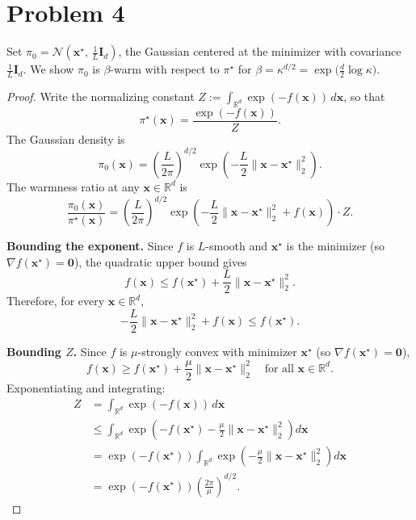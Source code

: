 \documentclass[12pt]{article}
\begin{document}
\section*{Problem 4}

Set $\pi_0 = \mathcal{N}\!\left(\mathbf{x}^\star,\, \frac{1}{L}\mathbf{I}_d\right)$, the Gaussian centered at the minimizer with covariance $\frac{1}{L}\mathbf{I}_d$. We show $\pi_0$ is $\beta$-warm with respect to $\pi^\star$ for $\beta = \kappa^{d/2} = \exp\!\bigl(\tfrac{d}{2}\log\kappa\bigr)$.

\begin{proof}
Write the normalizing constant $Z := \int_{\mathbb{R}^d} \exp(-f(\mathbf{x}))\,d\mathbf{x}$, so that
\[
\pi^\star(\mathbf{x}) = \frac{\exp(-f(\mathbf{x}))}{Z}.
\]
The Gaussian density is
\[
\pi_0(\mathbf{x}) = \left(\frac{L}{2\pi}\right)^{d/2} \exp\!\left(-\frac{L}{2}\|\mathbf{x} - \mathbf{x}^\star\|_2^2\right).
\]
The warmness ratio at any $\mathbf{x} \in \mathbb{R}^d$ is
\[
\frac{\pi_0(\mathbf{x})}{\pi^\star(\mathbf{x})} = \left(\frac{L}{2\pi}\right)^{d/2} \exp\!\left(-\frac{L}{2}\|\mathbf{x} - \mathbf{x}^\star\|_2^2 + f(\mathbf{x})\right) \cdot Z.
\]

\textbf{Bounding the exponent.} Since $f$ is $L$-smooth and $\mathbf{x}^\star$ is the minimizer (so $\nabla f(\mathbf{x}^\star) = \mathbf{0}$), the quadratic upper bound gives
\[
f(\mathbf{x}) \leq f(\mathbf{x}^\star) + \frac{L}{2}\|\mathbf{x} - \mathbf{x}^\star\|_2^2.
\]
Therefore, for every $\mathbf{x} \in \mathbb{R}^d$,
\[
-\frac{L}{2}\|\mathbf{x} - \mathbf{x}^\star\|_2^2 + f(\mathbf{x}) \leq f(\mathbf{x}^\star).
\]

\textbf{Bounding $Z$.} Since $f$ is $\mu$-strongly convex with minimizer $\mathbf{x}^\star$ (so $\nabla f(\mathbf{x}^\star) = \mathbf{0}$),
\[
f(\mathbf{x}) \geq f(\mathbf{x}^\star) + \frac{\mu}{2}\|\mathbf{x} - \mathbf{x}^\star\|_2^2 \quad \text{for all } \mathbf{x} \in \mathbb{R}^d.
\]
Exponentiating and integrating:
\begin{align*}
Z &= \int_{\mathbb{R}^d} \exp(-f(\mathbf{x}))\,d\mathbf{x} \\
  &\leq \int_{\mathbb{R}^d} \exp\!\left(-f(\mathbf{x}^\star) - \frac{\mu}{2}\|\mathbf{x} - \mathbf{x}^\star\|_2^2\right)d\mathbf{x} \\
  &= \exp(-f(\mathbf{x}^\star)) \int_{\mathbb{R}^d} \exp\!\left(-\frac{\mu}{2}\|\mathbf{x} - \mathbf{x}^\star\|_2^2\right)d\mathbf{x} \\
  &= \exp(-f(\mathbf{x}^\star)) \left(\frac{2\pi}{\mu}\right)^{d/2}.
\end{align*}


\end{proof}
\end{document}
